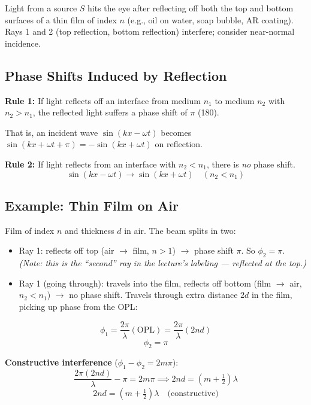 \documentclass[11pt]{report}
\begin{document}
Light from a source $S$ hits the eye after reflecting off both the top and bottom surfaces of a thin film of index $n$ (e.g., oil on water, soap bubble, AR coating). Rays 1 and 2 (top reflection, bottom reflection) interfere; consider near-normal incidence.

\subsection*{Phase Shifts Induced by Reflection}

\textbf{Rule 1:} If light reflects off an interface from medium $n_1$ to medium $n_2$ with $n_2 > n_1$, the reflected light suffers a phase shift of $\pi$ (180\textdegree).

That is, an incident wave $\sin(kx - \omega t)$ becomes $\sin(kx + \omega t + \pi) = -\sin(kx + \omega t)$ on reflection.

\textbf{Rule 2:} If light reflects from an interface with $n_2 < n_1$, there is \emph{no} phase shift.
\begin{equation}
\sin(kx - \omega t) \to \sin(kx + \omega t) \quad (n_2 < n_1)
\end{equation}

\subsection*{Example: Thin Film on Air}

Film of index $n$ and thickness $d$ in air. The beam splits in two:
\begin{itemize}
    \item Ray 1: reflects off top (air $\to$ film, $n > 1$) $\to$ phase shift $\pi$. So $\phi_2 = \pi$. \emph{(Note: this is the ``second'' ray in the lecture's labeling --- reflected at the top.)}
    \item Ray 1 (going through): travels into the film, reflects off bottom (film $\to$ air, $n_2 < n_1$) $\to$ no phase shift. Travels through extra distance $2d$ in the film, picking up phase from the OPL:
\end{itemize}
\begin{equation}
\phi_1 = \frac{2\pi}{\lambda}(\mathrm{OPL}) = \frac{2\pi}{\lambda}(2nd)
\end{equation}
\begin{equation}
\phi_2 = \pi
\end{equation}

\textbf{Constructive interference} ($\phi_1 - \phi_2 = 2m\pi$):
\begin{equation}
\frac{2\pi(2nd)}{\lambda} - \pi = 2m\pi \implies 2nd = \left(m + \tfrac{1}{2}\right)\lambda
\end{equation}
\begin{equation}
\boxed{2nd = \left(m + \tfrac{1}{2}\right)\lambda \quad \text{(constructive)}}
\end{equation}
\end{document}
